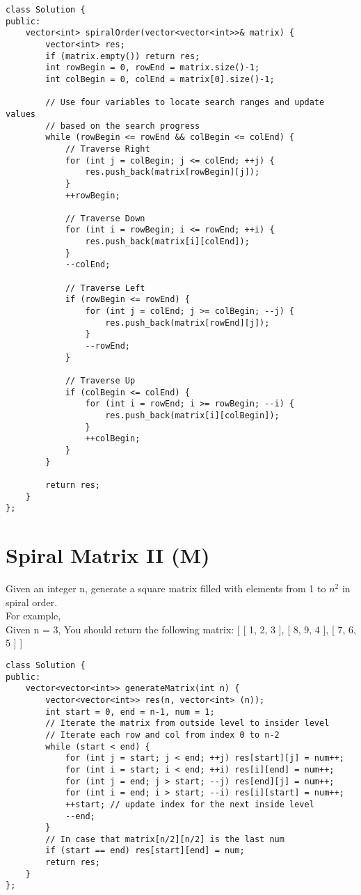 \begin{lstlisting}
class Solution {
public:
    vector<int> spiralOrder(vector<vector<int>>& matrix) {
        vector<int> res;
        if (matrix.empty()) return res;
        int rowBegin = 0, rowEnd = matrix.size()-1;
        int colBegin = 0, colEnd = matrix[0].size()-1;
        
        // Use four variables to locate search ranges and update values 
        // based on the search progress
        while (rowBegin <= rowEnd && colBegin <= colEnd) {
            // Traverse Right
            for (int j = colBegin; j <= colEnd; ++j) {
                res.push_back(matrix[rowBegin][j]);
            }
            ++rowBegin;
            
            // Traverse Down
            for (int i = rowBegin; i <= rowEnd; ++i) {
                res.push_back(matrix[i][colEnd]);
            }
            --colEnd;
            
            // Traverse Left
            if (rowBegin <= rowEnd) {
                for (int j = colEnd; j >= colBegin; --j) {
                    res.push_back(matrix[rowEnd][j]);
                }
                --rowEnd;
            }
            
            // Traverse Up
            if (colBegin <= colEnd) {
                for (int i = rowEnd; i >= rowBegin; --i) {
                    res.push_back(matrix[i][colBegin]);
                }
                ++colBegin;
            }
        }
        
        return res;
    }
};
\end{lstlisting}


\section{Spiral Matrix II (M)}
Given an integer n, generate a square matrix filled with elements from 1 to $n^2$ in spiral order.\\

For example,\\
Given n = 3,
You should return the following matrix:
[
 [ 1, 2, 3 ],
 [ 8, 9, 4 ],
 [ 7, 6, 5 ]
]\\

\begin{lstlisting}
class Solution {
public:
    vector<vector<int>> generateMatrix(int n) {
        vector<vector<int>> res(n, vector<int> (n));
        int start = 0, end = n-1, num = 1;
        // Iterate the matrix from outside level to insider level
        // Iterate each row and col from index 0 to n-2
        while (start < end) {
            for (int j = start; j < end; ++j) res[start][j] = num++;
            for (int i = start; i < end; ++i) res[i][end] = num++;
            for (int j = end; j > start; --j) res[end][j] = num++;
            for (int i = end; i > start; --i) res[i][start] = num++;
            ++start; // update index for the next inside level
            --end;
        }
        // In case that matrix[n/2][n/2] is the last num
        if (start == end) res[start][end] = num;
        return res;
    }
};
\end{lstlisting}


